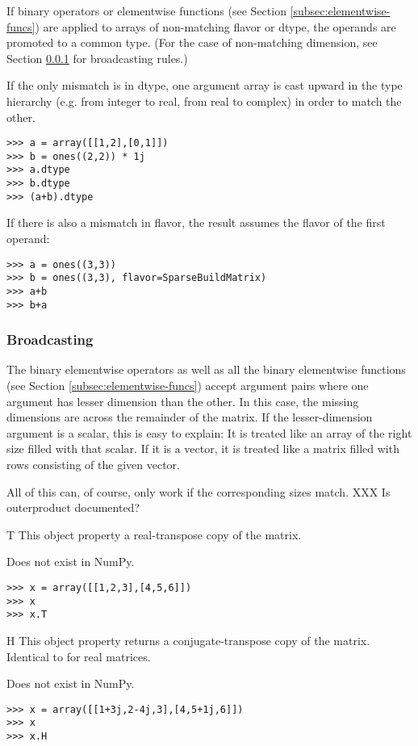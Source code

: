 If binary operators or elementwise functions (see Section
\ref{subsec:elementwise-funcs}) are applied to arrays of non-matching flavor or
dtype, the operands are promoted to a common type. (For the case of
non-matching dimension, see Section \ref{subsec:arraybroadcast} for
broadcasting rules.)

If the only mismatch is in dtype, one argument array
is cast upward in the type hierarchy (e.g. from integer to real,
from real to complex) in order to match the other.

\begin{verbatim}
>>> a = array([[1,2],[0,1]])
>>> b = ones((2,2)) * 1j
>>> a.dtype
>>> b.dtype
>>> (a+b).dtype
\end{verbatim}

If there is also a mismatch in flavor, the result assumes the flavor
of the first operand:

\begin{verbatim}
>>> a = ones((3,3))
>>> b = ones((3,3), flavor=SparseBuildMatrix)
>>> a+b
>>> b+a
\end{verbatim}

\subsubsection{Broadcasting}
\label{subsec:arraybroadcast}

The binary elementwise operators as well as all the binary elementwise
functions (see Section \ref{subsec:elementwise-funcs}) accept argument pairs
where one argument has lesser dimension than the other. In this case, the
missing dimensions are  across the remainder
of the matrix. If the lesser-dimension argument is a scalar, this is easy to
explain: It is treated like an array of the right size filled with that scalar.
If it is a vector, it is treated like a matrix filled with rows consisting of
the given vector.

All of this can, of course, only work if the corresponding  sizes 
match.
XXX Is outerproduct documented?
\begin{memberdesc}[Matrix]{T}
  This object property a real-transpose copy of the matrix.

  Does not exist in NumPy.
\begin{verbatim}
>>> x = array([[1,2,3],[4,5,6]])
>>> x
>>> x.T
\end{verbatim}
\end{memberdesc}

\begin{memberdesc}[Matrix]{H}
  This object property returns a conjugate-transpose copy of the matrix.
  Identical to  for real matrices.

  Does not exist in NumPy.
\begin{verbatim}
>>> x = array([[1+3j,2-4j,3],[4,5+1j,6]])
>>> x
>>> x.H
\end{verbatim}
\end{memberdesc}

